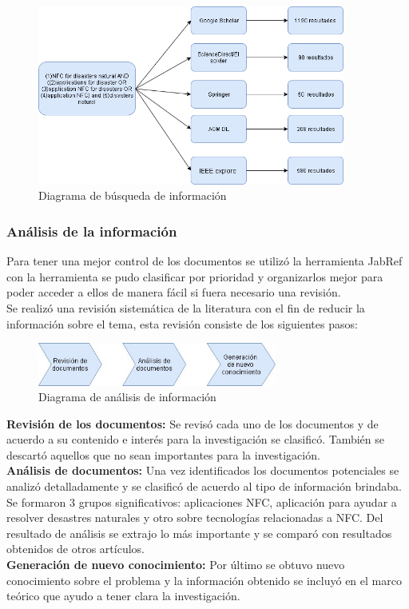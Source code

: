 \documentclass[11pt,openany]{book}
\newcounter{ns}
\begin{document}
	\begin{figure}[htb]
			\centering
			\includegraphics[width=0.9\textwidth]{imagenes/fuente.png}
			\caption{Diagrama de búsqueda de información}
			\label{Busqueda_de_informacion}
	\end{figure}

	\subsubsection{Análisis de la información}
	Para tener una mejor control de los documentos se utilizó la herramienta JabRef con la herramienta se pudo clasificar por prioridad y organizarlos  mejor para poder acceder a ellos de manera fácil si fuera necesario una revisión. \\
	Se realizó una revisión sistemática de la literatura con el fin de reducir la información sobre el tema, esta revisión consiste de los siguientes pasos:

	\begin{figure}[htb]
			\centering
			\includegraphics[width=0.7\textwidth]{imagenes/analisis.jpg}
			\caption{Diagrama de análisis de información}
			\label{Analisis_de_informacion}
	\end{figure}

	\textbf{Revisión de los documentos: }Se revisó cada uno de los documentos y de acuerdo a su contenido e interés para la investigación se clasificó. También se descartó aquellos que no sean importantes para la investigación.\\
	\textbf{Análisis de documentos: }Una vez identificados los documentos potenciales se analizó detalladamente y se clasificó de acuerdo al tipo de información brindaba. Se formaron 3 grupos significativos: aplicaciones NFC, aplicación para ayudar a resolver desastres naturales y otro sobre tecnologías relacionadas a NFC. Del resultado de análisis se extrajo lo más importante y se comparó con resultados obtenidos de otros artículos.\\
	\textbf{Generación de nuevo conocimiento: }Por último se obtuvo nuevo conocimiento sobre el problema y la información obtenido se incluyó en el marco teórico que ayudo a tener clara la investigación.\\
\end{document}
